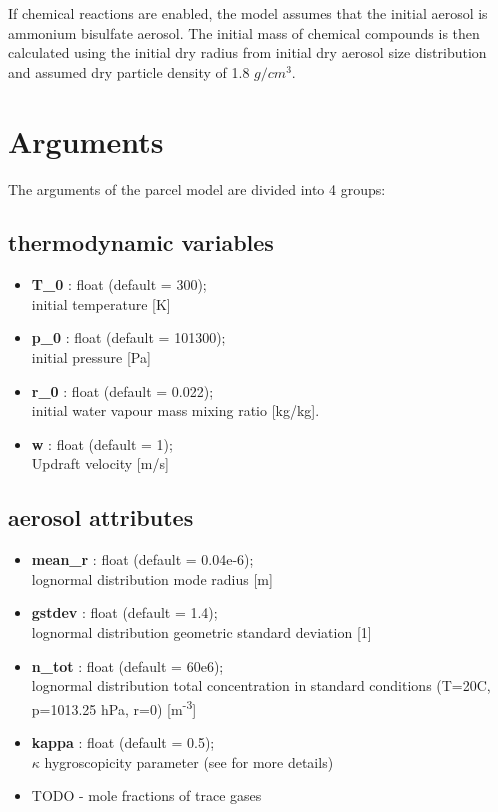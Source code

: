 \documentclass[11pt]{article}
\begin{document}
If chemical reactions are enabled, the model assumes that the initial aerosol is ammonium bisulfate aerosol.
The initial mass of chemical compounds is then calculated using the initial dry radius from initial 
  dry aerosol size distribution and assumed dry particle density of 1.8 $g/cm^3$.


\section{Arguments}

The arguments of the parcel model are divided into 4 groups:

\subsection{thermodynamic variables}

\begin{itemize}

  \item \textbf{T\_0} : float (default = 300);\\ initial temperature [K]
  \item \textbf{p\_0} : float (default = 101300);\\ initial pressure [Pa]
  \item \textbf{r\_0} : float (default = 0.022);\\ initial water vapour mass mixing ratio [kg/kg].
  \item \textbf{w} : float (default = 1);\\ Updraft velocity [m/s]

\end{itemize}

\subsection{aerosol attributes}

\begin{itemize}

  \item \textbf{mean\_r} : float (default = 0.04e-6);\\ lognormal distribution mode radius [m]
  \item \textbf{gstdev} : float (default = 1.4);\\ lognormal distribution geometric standard deviation [1]
  \item \textbf{n\_tot} : float (default = 60e6);\\ lognormal distribution total concentration in standard conditions 
                               (T=20C, p=1013.25 hPa, r=0) [m\textsuperscript{-3}]
  \item \textbf{kappa} : float (default = 0.5);\\ $\kappa$ hygroscopicity parameter (see \citep{Petters_et_al_2007} for more details)
  \item{TODO - mole fractions of trace gases}

\end{itemize}
\end{document}
